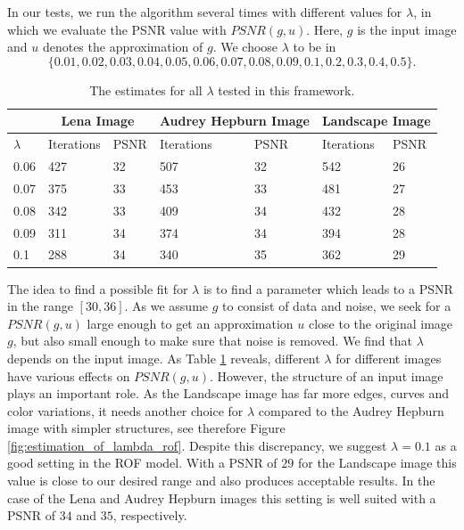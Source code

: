 \documentclass[abstracton]{scrreprt}
\begin{document}
            In our tests, we run the algorithm several times with different values for $\lambda$, in which we evaluate the PSNR value with $PSNR(g, u)$. Here, $g$ is the input image and $u$ denotes the approximation of $g$. We choose $\lambda$ to be in
                $$
                    \{ 0.01, 0.02, 0.03, 0.04, 0.05, 0.06, 0.07, 0.08, 0.09, 0.1, 0.2, 0.3, 0.4, 0.5 \}.
                $$
            \begin{table}[!ht]
                \centering
                \begin{tabular}{| l | l | l | l | l | l | l |}
                    \hline
                    & \multicolumn{2}{|c|}{Lena Image} & \multicolumn{2}{|c|}{Audrey Hepburn Image} & \multicolumn{2}{|c|}{Landscape Image} \\ \hline\hline 
                    $\lambda$ & Iterations & PSNR & Iterations & PSNR & Iterations & PSNR \\ \hline\hline
                    0.06 & 427 & 32 & 507 & 32 & 542 & 26 \\ \hline
                    0.07 & 375 & 33 & 453 & 33 & 481 & 27 \\ \hline
                    0.08 & 342 & 33 & 409 & 34 & 432 & 28 \\ \hline
                    0.09 & 311 & 34 & 374 & 34 & 394 & 28 \\ \hline
                    0.1 & 288 & 34 & 340 & 35 & 362 & 29 \\ \hline
                \end{tabular}
                \caption[Overview of values for $\lambda$ in the ROF model.]{The estimates for all $\lambda$ tested in this framework.}
                \label{tab:estimation_of_lambda_rof}
            \end{table}
            The idea to find a possible fit for $\lambda$ is to find a parameter which leads to a PSNR in the range $[30, 36]$. As we assume $g$ to consist of data and noise, we seek for a $PSNR(g, u)$ large enough to get an approximation $u$ close to the original image $g$, but also small enough to make sure that noise is removed. We find that $\lambda$ depends on the input image. As Table \ref{tab:estimation_of_lambda_rof} reveals, different $\lambda$ for different images have various effects on $PSNR(g, u)$. However, the structure of an input image plays an important role. As the Landscape image has far more edges, curves and color variations, it needs another choice for $\lambda$ compared to the Audrey Hepburn image with simpler structures, see therefore Figure \ref{fig:estimation_of_lambda_rof}. Despite this discrepancy, we suggest $\lambda = 0.1$ as a good setting in the ROF model. With a PSNR of $29$ for the Landscape image this value is close to our desired range and also produces acceptable results. In the case of the Lena and Audrey Hepburn images this setting is well suited with a PSNR of $34$ and $35$, respectively.
\end{document}
